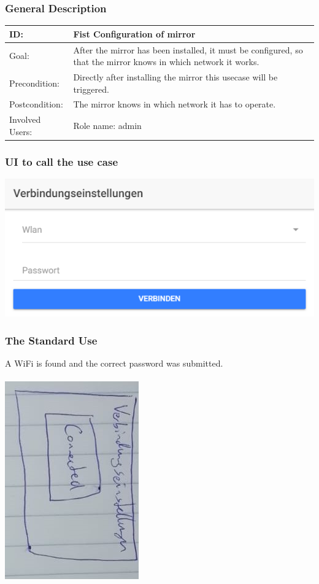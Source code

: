 \documentclass[12pt]{article}
\theoremstyle{definition}
\begin{document}
\subsubsection{General Description}
\begin{tabular}{|p{.2\linewidth}|p{.65\linewidth}|}
\hline 
ID: & Fist Configuration of mirror \\ \hline
Goal: & After the mirror has been installed, it must be configured, so that the mirror knows in which network it works.\\ \hline
Precondition: & Directly after installing the mirror this usecase will be triggered. \\ \hline
Postcondition: & The mirror knows in which network it has to operate. \\ \hline
Involved Users: & Role name: admin \\ \hline
\end{tabular}

\subsubsection{UI to call the use case}
\begin{center}
\includegraphics[scale=.8]{UseCase/StandartWlanEinstellungen.PNG}\\
\end{center}

\subsubsection{The Standard Use}
A WiFi is found and the correct password was submitted.\\\\
\includegraphics[angle=90, scale=.8]{UseCase/VerbindungHergestelltMitInternet.jpeg}\\
\end{document}
